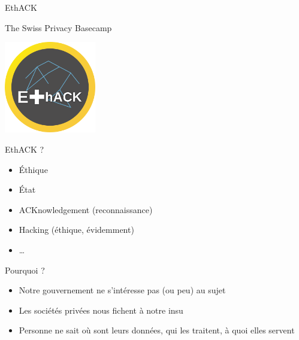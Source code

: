 {

{
\centering
\begin{frame}

EthACK
\vspace{0.5cm}

The Swiss Privacy Basecamp 
\vspace{0.5cm}

\includegraphics[width=4cm]{../common/logo_537.png}

\end{frame}
}
}

\begin{frame}{EthACK ?}
\begin{itemize}
	\item Éthique
	\item État
	\item ACKnowledgement (reconnaissance)
	\item Hacking (éthique, évidemment)
	\item …
\end{itemize}
\end{frame}

\begin{frame}{Pourquoi ?}
\begin{itemize}
	\item Notre gouvernement ne s'intéresse pas (ou peu) au sujet
	\item Les sociétés privées nous fichent à notre insu
	\item Personne ne sait où sont leurs données, qui les traitent, à quoi elles servent
\end{itemize}
\end{frame}
